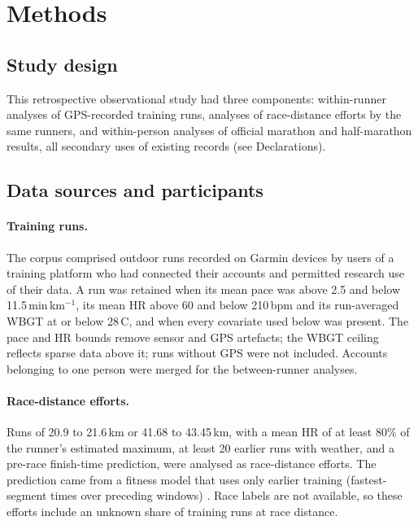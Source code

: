 \documentclass[12pt]{article}
\newcommand{\degC}{\,\textdegree C}
\begin{document}
\section{Methods}
\subsection{Study design}
This retrospective observational study had three components: within-runner analyses of GPS-recorded training runs, analyses of race-distance efforts by the same runners, and within-person analyses of official marathon and half-marathon results, all secondary uses of existing records (see Declarations).

\subsection{Data sources and participants}
\paragraph{Training runs.} The corpus comprised outdoor runs recorded on Garmin devices by users of a training platform who had connected their accounts and permitted research use of their data. A run was retained when its mean pace was above 2.5 and below 11.5\,min\,km$^{-1}$, its mean HR above 60 and below 210\,bpm and its run-averaged WBGT at or below 28\degC, and when every covariate used below was present. The pace and HR bounds remove sensor and GPS artefacts; the WBGT ceiling reflects sparse data above it; runs without GPS were not included. Accounts belonging to one person were merged for the between-runner analyses.

\paragraph{Race-distance efforts.} Runs of 20.9 to 21.6\,km or 41.68 to 43.45\,km, with a mean HR of at least 80\% of the runner's estimated maximum, at least 20 earlier runs with weather, and a pre-race finish-time prediction, were analysed as race-distance efforts. The prediction came from a fitness model that uses only earlier training (fastest-segment times over preceding windows) \cite{dunphy2026extended}. Race labels are not available, so these efforts include an unknown share of training runs at race distance.
\end{document}
